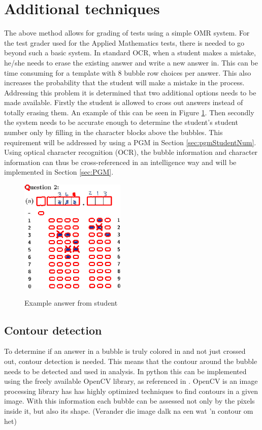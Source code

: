 \section{Additional techniques}
The above method allows for grading of tests using a simple OMR system. For the test grader used for the Applied Mathematics tests, there is needed to go beyond such a basic system.  In standard OCR, when a student makes a mistake, he/she needs to erase the existing answer and write a new answer in. This can be time consuming for a template with 8 bubble row choices per answer. This also increases the probability that the student will make a mistake in the process. Addressing this problem it is determined that two additional options needs to be made available. Firstly the student is allowed to cross out answers instead of totally erasing them. An example of this can be seen in Figure \ref{fig:Cross}. Then secondly the system needs to be accurate enough to determine the student's student number only by filling in the character blocks above the bubbles. This requirement will be addressed by using a PGM in Section \ref{sec:pgmStudentNum}. Using optical character recognition (OCR), the bubble information and character information can thus be cross-referenced in an intelligence way and will be implemented in Section \ref{sec:PGM}.

\begin{figure}
  \centering
  \includegraphics[width=5cm]{Cross}\\
  \caption{Example answer from student}
  \label{fig:Cross}
\end{figure}

\subsection{Contour detection}
To determine if an answer in a bubble is truly colored in and not just crossed out, contour detection is needed. This means that the contour around the bubble needs to be detected and used in analysis. In python this can be implemented using the freely available OpenCV library, as referenced in \citet{AdrianR2016}. OpenCV is an image processing library has has highly optimized techniques to find contours in a given image. With this information each bubble can be assessed not only by the pixels inside it, but also its shape. (Verander die image dalk na een wat 'n contour om het)

